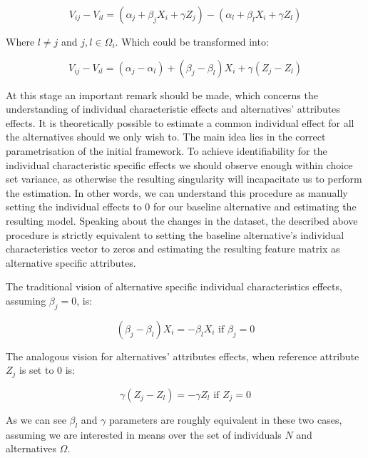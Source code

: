 \documentclass[12pt,]{article}
\begin{document}
\begin{equation}
V_{ij} - V_{il} = (\alpha_j + \beta_j X_i + \gamma Z_j) - (\alpha_l + \beta_l X_i + \gamma Z_l)
\end{equation}

Where \(l \neq j\) and \(j, l \in \Omega_i\). Which could be transformed
into:

\begin{equation}
V_{ij} - V_{il} = (\alpha_j - \alpha_l) + (\beta_j - \beta_l) X_i + \gamma (Z_j - Z_l)
\end{equation}

At this stage an important remark should be made, which concerns the
understanding of individual characteristic effects and alternatives'
attributes effects. It is theoretically possible to estimate a common
individual effect for all the alternatives should we only wish to. The
main idea lies in the correct parametrisation of the initial framework.
To achieve identifiability for the individual characteristic specific
effects we should observe enough within choice set variance, as
otherwise the resulting singularity will incapacitate us to perform the
estimation. In other words, we can understand this procedure as manually
setting the individual effects to 0 for our baseline alternative and
estimating the resulting model. Speaking about the changes in the
dataset, the described above procedure is strictly equivalent to setting
the baseline alternative's individual characteristics vector to zeros
and estimating the resulting feature matrix as alternative specific
attributes.

The traditional vision of alternative specific individual
characteristics effects, assuming \(\beta_j = 0\), is:

\begin{equation}
(\beta_j - \beta_l) X_i = - \beta_l X_i \text{ if } \beta_j = 0
\end{equation}

The analogous vision for alternatives' attributes effects, when
reference attribute \(Z_j\) is set to 0 is:

\begin{equation}
\gamma (Z_j - Z_l) = - \gamma Z_l \text{ if } Z_j = 0
\end{equation}

As we can see \(\beta_l\) and \(\gamma\) parameters are roughly
equivalent in these two cases, assuming we are interested in means over
the set of individuals \(N\) and alternatives \(\Omega\).
\end{document}
